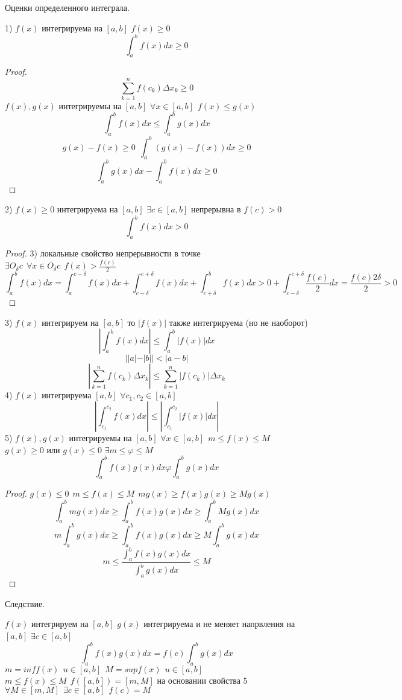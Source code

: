 \begin{title}[\Large]
    Оценки определенного интеграла.
\end{title}
1) $f(x)$ интегрируема на $[a, b]$ $f(x) \ge 0$
\[\int_a^b f(x)dx \ge 0\]
\begin{proof}
    \[\sum_{k=1}^{n} f(c_k)\Delta x_k \ge 0\]
    $f(x), g(x)$ интегрируемы на $[a, b]$ $\forall x \in [a, b] ~~ f(x)\le g(x)$
    \[\int_a^b f(x)dx \le \int_a^b g(x)dx\]
    \[g(x) - f(x) \ge 0 ~~ \int_a^b (g(x) - f(x))dx \ge 0\]
    \[\int_a^b g(x)dx - \int_a^b f(x)dx \ge 0\]
\end{proof}
2) $f(x) \ge 0$ интегрируема на $[a, b]$ $\exists c \in [a, b]$ непрерывна в
$f(c) > 0$ \[\int_a^b f(x)dx > 0\]
\begin{proof}
    3) локальные свойство непрерывности в точке $\exists O_{\delta}c ~~
    \forall x \in O_{\delta}c ~~ f(x) > \frac{f(c)}{2}$
    \[
        \int_a^b f(x)dx = \int_a^{c-\delta} f(x)dx +
        \int_{c-\delta}^{c+\delta} f(x)dx + \int_{c+\delta}^b f(x)dx >
        0 + \int_{c-\delta}^{c+\delta} \frac{f(c)}{2}dx
        = \frac{f(c) 2\delta}{2} > 0
    \]
\end{proof}
3) $f(x)$ интегрируем на $[a, b]$ то $|f(x)|$ также интегрируема
(но не наоборот)
\[\left| \int_a^b f(x)dx \right| \le \int_a^b |f(x)|dx\]
\[||a| - |b|| < |a - b|\]
\[
    \left| \sum_{k=1}^n f(c_k)\Delta x_k \right| \le
    \sum_{k=1}^{n}|f(c_k)|\Delta x_k
\]
4) $f(x)$ интегрируема $[a, b]$ $\forall c_1, c_2 \in [a, b]$
\[
    \left| \int_{c_1}^{c_2} f(x)dx \right| \le
    \left| \int_{c_1}^{c_2} |f(x)|dx \right|
\]
5) $f(x), g(x)$ интегрируемы на $[a, b]$ $\forall x \in [a, b] ~~
m \le f(x) \le M$ $g(x) \ge 0$ или $g(x) \le 0$ $\exists m \le \varphi \le M$
\[\int_a^b f(x)g(x)dx \varphi \int_a^b g(x)dx\]
\begin{proof}
    $g(x) \le 0 ~~ m \le f(x) \le M ~~ mg(x) \ge f(x)g(x) \ge Mg(x)$
    \[\int_a^b mg(x)dx \ge \int_a^b f(x)g(x)dx \ge \int_a^b Mg(x)dx\]
    \[m\int_a^b g(x)dx \ge \int_a^b f(x)g(x)dx \ge M\int_a^b g(x)dx\]
    \[m \le \frac{\int_a^b f(x)g(x)dx}{\int_a^b g(x)dx} \le M\]
\end{proof}

Следствие.\\
\begin{theorem}
    $f(x)$ интегрируем на $[a, b]$ $g(x)$ интегрируема и не меняет напрвления на
    $[a, b]$ $\exists c \in [a, b]$
    \[\int_a^b f(x)g(x)dx  = f(c) \int_a^b g(x)dx\]
    $m = inf f(x) ~~ u \in [a, b] ~~ M = sup f(x) ~~ u \in [a, b]$
    $m \le f(x) \le M ~~ f([a, b]) = [m, M]$ на основании свойства 5
    $\forall M \in [m, M] ~~ \exists c \in [a, b] ~~ f(c) = M$
\end{theorem}
